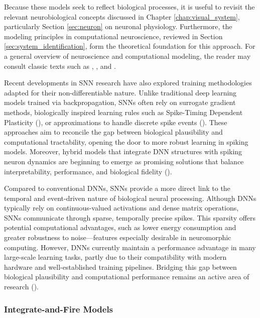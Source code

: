 Because these models seek to reflect biological processes, it is useful to revisit the relevant neurobiological concepts discussed in Chapter \ref{chap:visual_system}, particularly Section \ref{sec:neuron} on neuronal physiology. Furthermore, the modeling principles in computational neuroscience, reviewed in Section \ref{sec:system_identification}, form the theoretical foundation for this approach. For a general overview of neuroscience and computational modeling, the reader may consult classic texts such as \citet{bear2020neuroscience}, \citet{dayan2005theoretical}, and \citet{gerstner2002spiking}.

Recent developments in SNN research have also explored training methodologies adapted for their non-differentiable nature. Unlike traditional deep learning models trained via backpropagation, SNNs often rely on surrogate gradient methods, biologically inspired learning rules such as Spike-Timing Dependent Plasticity (\citet{Bi1998synaptic, caporale2008hebbian}), or approximations to handle discrete spike events (\citet{haslinger2010discrete}). These approaches aim to reconcile the gap between biological plausibility and computational tractability, opening the door to more robust learning in spiking models. Moreover, hybrid models that integrate DNN structures with spiking neuron dynamics are beginning to emerge as promising solutions that balance interpretability, performance, and biological fidelity (\citet{Eshraghian2023trainsnn, lee_training_2016}).

Compared to conventional DNNs, SNNs provide a more direct link to the temporal and event-driven nature of biological neural processing. Although DNNs typically rely on continuous-valued activations and dense matrix operations, SNNs communicate through sparse, temporally precise spikes. This sparsity offers potential computational advantages, such as lower energy consumption and greater robustness to noise—features especially desirable in neuromorphic computing. However, DNNs currently maintain a performance advantage in many large-scale learning tasks, partly due to their compatibility with modern hardware and well-established training pipelines. Bridging this gap between biological plausibility and computational performance remains an active area of research (\citet{Eshraghian2023trainsnn}).

\subsubsection{Integrate-and-Fire Models}
\label{subsubsec:integrate_and_fire}

